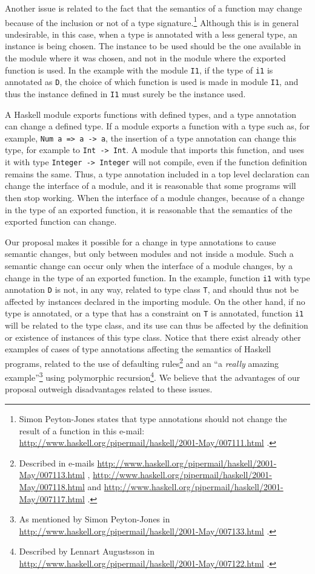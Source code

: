 \documentclass[msc]{ppgccufmg}
\begin{document}
Another issue is related to the fact that the semantics of a function
may change because of the inclusion or not of a type
signature.\footnote{Simon Peyton-Jones states that type annotations
  should not change the result of a function in this e-mail:
  \url{http://www.haskell.org/pipermail/haskell/2001-May/007111.html}
  .} Although this is in general undesirable, in this case, when a
type is annotated with a less general type, an instance is being
chosen.  The instance to be used should be the one available in the
module where it was chosen, and not in the module where the exported
function is used. In the example with the module \texttt{I1}, if the
type of \texttt{i1} is annotated as \texttt{D}, the choice of which
function is used is made in module \texttt{I1}, and thus the instance
defined in \texttt{I1} must surely be the instance used.

A Haskell module exports functions with defined types, and a type
annotation can change a defined type. If a module exports a function
with a type such as, for example, \texttt{Num a => a -> a}, the
insertion of a type annotation can change this type, for example to
\texttt{Int -> Int}. A module that imports this function, and uses it
with type \texttt{Integer -> Integer} will not compile, even if the
function definition remains the same.  Thus, a type annotation
included in a top level declaration can change the interface of a
module, and it is reasonable that some programs will then stop
working.  When the interface of a module changes, because of a change
in the type of an exported function, it is reasonable that the
semantics of the exported function can change.

Our proposal makes it possible for a change in type annotations to
cause semantic changes, but only between modules and not inside a
module. Such a semantic change can occur only when the interface of a
module changes, by a change in the type of an exported function. In
the example, function \texttt{i1} with type annotation \texttt{D} is
not, in any way, related to type class \texttt{T}, and should thus not
be affected by instances declared in the importing module.  On the
other hand, if no type is annotated, or a type that has a constraint
on \texttt{T} is annotated, function \texttt{i1} will be related to the
type class, and its use can thus be affected by the definition or
existence of instances of this type class.  Notice that there exist
already other examples of cases of type annotations affecting the
semantics of Haskell programs, related to the use of defaulting
rules\footnote{Described in e-mails
  \url{http://www.haskell.org/pipermail/haskell/2001-May/007113.html}
  ,
  \url{http://www.haskell.org/pipermail/haskell/2001-May/007118.html}
  and
  \url{http://www.haskell.org/pipermail/haskell/2001-May/007117.html}
  .} and an ``a \textit{really\/} amazing example''\footnote{As
  mentioned by Simon Peyton-Jones in
  \url{http://www.haskell.org/pipermail/haskell/2001-May/007133.html}
  .} using polymorphic recursion\footnote{Described by Lennart
  Augustsson in
  \url{http://www.haskell.org/pipermail/haskell/2001-May/007122.html}
  .}.  We believe that the advantages of our proposal outweigh
disadvantages related to these issues.
\end{document}
